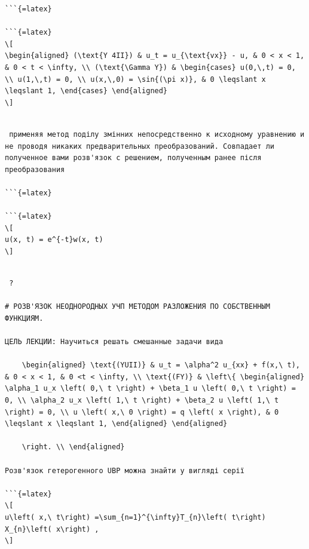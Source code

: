 \documentclass[
  ukrainian,
]{article}
\begin{document}
\begin{verbatim}
```{=latex}

```{=latex}
\[
\begin{aligned} (\text{Y 4II}) & u_t = u_{\text{vx}} - u, & 0 < x < 1, & 0 < t < \infty, \\ (\text{\Gamma Y}) & \begin{cases} u(0,\,t) = 0, \\ u(1,\,t) = 0, \\ u(x,\,0) = \sin{(\pi x)}, & 0 \leqslant x \leqslant 1, \end{cases} \end{aligned}
\]
\end{verbatim}

\begin{verbatim}

 применяя метод поділу змінних непосредственно к исходному уравнению и не проводя никаких предварительных преобразований. Совпадает ли полученное вами розв'язок с решением, полученным ранее після преобразования

```{=latex}

```{=latex}
\[
u(x, t) = e^{-t}w(x, t)
\]
\end{verbatim}

\begin{verbatim}

 ?

# РОЗВ'ЯЗОК НЕОДНОРОДНЫХ УЧП МЕТОДОМ РАЗЛОЖЕНИЯ ПО СОБСТВЕННЫМ ФУНКЦИЯМ.

ЦЕЛЬ ЛЕКЦИИ: Научиться решать смешанные задачи вида

    \begin{aligned} \text{(YUII)} & u_t = \alpha^2 u_{xx} + f(x,\ t), & 0 < x < 1, & 0 <t < \infty, \\ \text{(FY)} & \left\{ \begin{aligned} \alpha_1 u_x \left( 0,\ t \right) + \beta_1 u \left( 0,\ t \right) = 0, \\ \alpha_2 u_x \left( 1,\ t \right) + \beta_2 u \left( 1,\ t \right) = 0, \\ u \left( x,\ 0 \right) = q \left( x \right), & 0 \leqslant x \leqslant 1, \end{aligned} \end{aligned}

    \right. \\ \end{aligned}

Розв'язок гетерогенного UBP можна знайти у вигляді серії

```{=latex}
\[
u\left( x,\ t\right) =\sum_{n=1}^{\infty}T_{n}\left( t\right) X_{n}\left( x\right) ,
\]
\end{verbatim}
\end{document}
